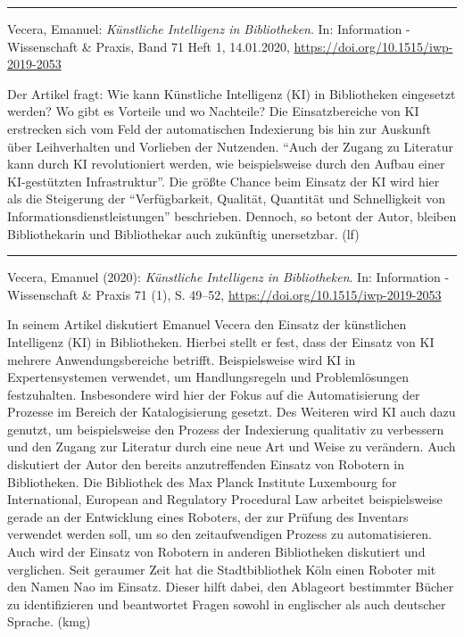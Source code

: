 \documentclass[a4paper,
fontsize=11pt,
oneside,
numbers=noperiodatend,
parskip=half-,
bibliography=totoc,
final
]{scrartcl}
\begin{document}
 \begin{center}\rule{0.5\linewidth}{0.5pt}\end{center}

Vecera, Emanuel: \emph{Künstliche Intelligenz in Bibliotheken}. In:
Information - Wissenschaft \& Praxis, Band 71 Heft 1, 14.01.2020,
\url{https://doi.org/10.1515/iwp-2019-2053}

Der Artikel fragt: Wie kann Künstliche Intelligenz (KI) in Bibliotheken
eingesetzt werden? Wo gibt es Vorteile und wo Nachteile? Die
Einsatzbereiche von KI erstrecken sich vom Feld der automatischen
Indexierung bis hin zur Auskunft über Leihverhalten und Vorlieben der
Nutzenden. \enquote{Auch der Zugang zu Literatur kann durch KI
revolutioniert werden, wie beispielsweise durch den Aufbau einer
KI-gestützten Infrastruktur}. Die größte Chance beim Einsatz der KI wird
hier als die Steigerung der \enquote{Verfügbarkeit, Qualität, Quantität
und Schnelligkeit von Informationsdienstleistungen} beschrieben.
Dennoch, so betont der Autor, bleiben Bibliothekarin und Bibliothekar
auch zukünftig unersetzbar. (lf)

\begin{center}\rule{0.5\linewidth}{0.5pt}\end{center}

Vecera, Emanuel (2020): \emph{Künstliche Intelligenz in Bibliotheken}.
In: Information - Wissenschaft \& Praxis 71 (1), S. 49--52,
\url{https://doi.org/10.1515/iwp-2019-2053}

In seinem Artikel diskutiert Emanuel Vecera den Einsatz der künstlichen
Intelligenz (KI) in Bibliotheken. Hierbei stellt er fest, dass der
Einsatz von KI mehrere Anwendungsbereiche betrifft. Beispielsweise wird
KI in Expertensystemen verwendet, um Handlungsregeln und Problemlösungen
festzuhalten. Insbesondere wird hier der Fokus auf die Automatisierung
der Prozesse im Bereich der Katalogisierung gesetzt. Des Weiteren wird
KI auch dazu genutzt, um beispielsweise den Prozess der Indexierung
qualitativ zu verbessern und den Zugang zur Literatur durch eine neue
Art und Weise zu verändern. Auch diskutiert der Autor den bereits
anzutreffenden Einsatz von Robotern in Bibliotheken. Die Bibliothek des
Max Planck Institute Luxembourg for International, European and
Regulatory Procedural Law arbeitet beispielsweise gerade an der
Entwicklung eines Roboters, der zur Prüfung des Inventars verwendet
werden soll, um so den zeitaufwendigen Prozess zu automatisieren. Auch
wird der Einsatz von Robotern in anderen Bibliotheken diskutiert und
verglichen. Seit geraumer Zeit hat die Stadtbibliothek Köln einen
Roboter mit den Namen Nao im Einsatz. Dieser hilft dabei, den Ablageort
bestimmter Bücher zu identifizieren und beantwortet Fragen sowohl in
englischer als auch deutscher Sprache. (kmg)
\end{document}
